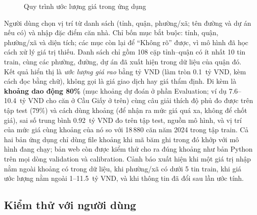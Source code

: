 \documentclass[11pt]{article}
\newcommand{\ty}{tỷ VND}
\begin{document}
\begin{figure}[H]
\centering
{}
\caption{Quy trình ước lượng giá trong ứng dụng}
\end{figure}

Người dùng chọn vị trí từ danh sách (tỉnh, quận, phường/xã; tên đường và dự án nếu có) và nhập đặc điểm căn nhà.
Chỉ bốn mục bắt buộc: tỉnh, quận, phường/xã và diện tích; các mục còn lại để ``Không rõ'' được, vì mô hình đã học
cách xử lý giá trị thiếu. Danh sách chỉ gồm 108 cặp tỉnh--quận có ít nhất 10 tin train, cùng các phường, đường, dự án
đã xuất hiện trong dữ liệu của quận đó. Kết quả hiển thị là \textit{ước lượng giá rao} bằng \ty{} (làm tròn 0.1~\ty,
kèm cách đọc bằng chữ), không gọi là giá giao dịch hay giá thẩm định. Đi kèm là \textbf{khoảng dao động 80\%} (mục
khoảng dự đoán ở phần Evaluation; ví dụ 7.6--10.4~\ty{} cho căn ở Cầu Giấy ở trên) cùng câu giải thích độ phủ đo được
trên tập test (79\%) và cách dùng khoảng (để nhận ra mức giá quá xa, không để chốt giá), sai số trung bình 0.92~\ty{}
đo trên tập test, nguồn mô hình, và vị trí của mức giá cùng khoảng của nó so với 18\,880 căn năm 2024 trong tập train. Cả hai bản ứng dụng chỉ dùng file khoảng khi mã băm
ghi trong đó khớp với mô hình đang chạy; bản web còn được kiểm thử cho ra đúng khoảng như bản Python trên mọi dòng
validation và calibration. Cảnh báo xuất hiện khi một giá trị nhập nằm ngoài khoảng có trong dữ liệu,
khi phường/xã có dưới 5 tin train, khi giá ước lượng nằm ngoài 1--11.5~\ty, và khi thông tin đã đổi sau lần ước tính.

\subsection{Kiểm thử với người dùng}
\end{document}

